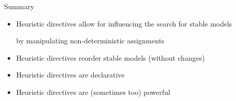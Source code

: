 \begin{frame}[c]{Summary}
  \begin{itemize}
  \item Heuristic directives allow for influencing the search for stable models
    \par\smallskip
    by manipulating non-deterministic assignments
    \bigskip
  \item Heuristic directives reorder stable models (without changes)
    \smallskip
  \item Heuristic directives are declarative
    \smallskip
  \item Heuristic directives are (sometimes too) powerful
  \end{itemize}
\end{frame}
%
